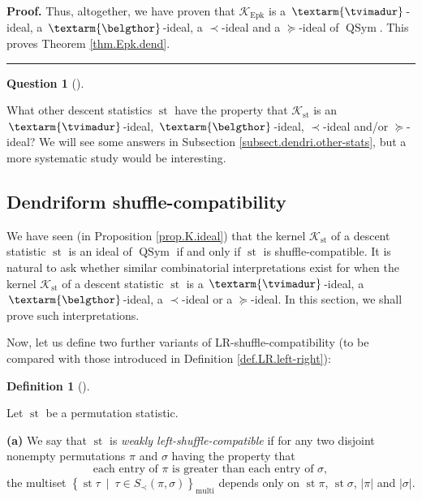\documentclass[numbers=enddot,12pt,final,onecolumn,notitlepage]{scrartcl}%
\theoremstyle{definition}
\newtheorem{defi}[theo]{Definition}
\newenvironment{definition}[1][]
{\begin{defi}[#1]\begin{leftbar}}
{\end{leftbar}\end{defi}}
\newtheorem{quest}[theo]{Question}
\newenvironment{question}[1][]
{\begin{quest}[#1]\begin{leftbar}}
{\end{leftbar}\end{quest}}
\newenvironment{proof}[1][Proof]{\noindent\textbf{#1.} }{\ \rule{0.5em}{0.5em}}
\newenvironment{question}[1][Question]{\noindent\textbf{#1.} }{\ \rule{0.5em}{0.5em}}
\newenvironment{verlong}{}{}
\newcommand{\tvi}{\left. \textarm{\tvimadur} \right.}
\newcommand{\bel}{\left. \textarm{\belgthor} \right.}
\begin{document}
\begin{verlong}
\begin{proof}
Thus, altogether, we have proven that $\mathcal{K}_{\operatorname{Epk}}$ is a
$\tvi$-ideal, a $\bel$-ideal, a $\left.  \prec\right.  $-ideal and a $\left.
\succeq\right.  $-ideal of $\operatorname*{QSym}$. This proves Theorem
\ref{thm.Epk.dend}.
\end{proof}

\begin{question}
What other descent statistics $\operatorname{st}$ have the property that
$\mathcal{K}_{\operatorname{st}}$ is an $\tvi$-ideal, $\bel$-ideal, $\left.
\prec\right.  $-ideal and/or $\left.  \succeq\right.  $-ideal? We will see
some answers in Subsection \ref{subsect.dendri.other-stats}, but a more
systematic study would be interesting.
\end{question}

\subsection{Dendriform shuffle-compatibility}

We have seen (in Proposition \ref{prop.K.ideal}) that the kernel
$\mathcal{K}_{\operatorname{st}}$ of a descent statistic $\operatorname{st}$
is an ideal of $\operatorname*{QSym}$ if and only if $\operatorname{st}$ is
shuffle-compatible. It is natural to ask whether similar combinatorial
interpretations exist for when the kernel $\mathcal{K}_{\operatorname{st}}$
of a descent statistic $\operatorname{st}$ is a $\tvi$-ideal, a $\bel$-ideal,
a $\left.  \prec\right.  $-ideal or a $\left.  \succeq\right.  $-ideal. In
this section, we shall prove such interpretations.

Now, let us define two further variants of LR-shuffle-compatibility (to be
compared with those introduced in Definition \ref{def.LR.left-right}):

\begin{definition}
Let $\operatorname{st}$ be a permutation statistic.

\textbf{(a)} We say that $\operatorname{st}$ is \textit{weakly
left-shuffle-compatible} if for any two disjoint nonempty permutations $\pi$
and $\sigma$ having the property that%
\begin{equation}
\text{each entry of }\pi\text{ is greater than each entry of }\sigma,
\label{eq.def.dendri.dsc.weak-ass}%
\end{equation}
the multiset $\left\{  \operatorname{st} \tau   \ \mid\ \tau\in
S_{\prec}\left(  \pi,\sigma\right)  \right\}  _{\operatorname*{multi}}$
depends only on $\operatorname{st} \pi$, $\operatorname{st} \sigma$,
$\left\vert \pi\right\vert $ and $\left\vert \sigma\right\vert $.


\end{definition}
\end{verlong}
\end{document}
